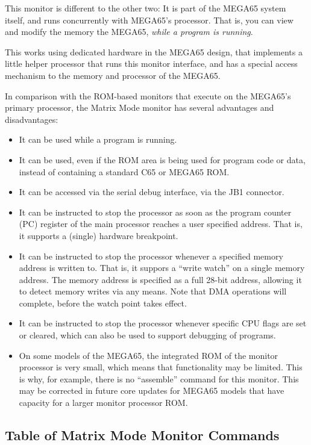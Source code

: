 This monitor is different to the other two: It is part of the MEGA65
system itself, and runs concurrently with MEGA65's processor. That is,
you can view and modify the memory the MEGA65, {\em while a program is running}.

This works using dedicated hardware in the MEGA65 design, that implements a little
helper processor that runs this monitor interface, and has a special access mechanism
to the memory and processor of the MEGA65.

In comparison with the ROM-based monitors that execute on the MEGA65's primary processor,
the Matrix Mode monitor has several advantages and disadvantages:
\begin{itemize}
\item It can be used while a program is running.
\item It can be used, even if the ROM area is being used for program code or data,
  instead of containing a standard C65 or MEGA65 ROM.
\item It can be accessed via the serial debug interface, via the JB1 connector.
\item It can be instructed to stop the processor as soon as the program counter (PC)
  register of the main processor reaches a user specified address. That is, it supports
  a (single) hardware breakpoint.
\item It can be instructed to stop the processor whenever a specified memory address
  is written to. That is, it suppors a ``write watch'' on a single memory address.
  The memory address is specified as a full 28-bit address, allowing it to detect memory
  writes via any means. Note that DMA operations will complete, before the watch point
  takes effect.
\item It can be instructed to stop the processor whenever specific CPU flags are set
  or cleared, which can also be used to support debugging of programs.
\item On some models of the MEGA65, the integrated ROM of the monitor processor is
  very small, which means that functionality may be limited. This is why, for example,
  there is no ``assemble'' command for this monitor.  This may be corrected in future
  core updates for MEGA65 models that have capacity for a larger monitor processor ROM.
\end{itemize}

\subsection{Table of Matrix Mode Monitor Commands}

